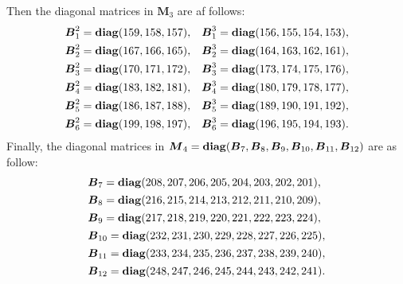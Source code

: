 \documentclass[12pt]{article}
\begin{document}
Then the diagonal matrices in $\boldsymbol{M}_{3}$ are af follows:
\begin{equation*}
	\begin{array}{ll}
		\boldsymbol{B}_{1}^{2}={\rm\bf diag}(159,158,157), 
		&\boldsymbol{B}_{1}^{3}={\rm\bf diag}(156,155,154,153),\\[4pt]
		\boldsymbol{B}_{2}^{2}={\rm\bf diag}(167,166,165), 
		&\boldsymbol{B}_{2}^{3}={\rm\bf diag}(164,163,162,161),\\[4pt]
		\boldsymbol{B}_{3}^{2}={\rm\bf diag}(170,171,172), 
		&\boldsymbol{B}_{3}^{3}={\rm\bf diag}(173,174,175,176),\\[4pt]
		\boldsymbol{B}_{4}^{2}={\rm\bf diag}(183,182,181), 
		&\boldsymbol{B}_{4}^{3}={\rm\bf diag}(180,179,178,177),\\[4pt]
		\boldsymbol{B}_{5}^{2}={\rm\bf diag}(186,187,188), 
		&\boldsymbol{B}_{5}^{3}={\rm\bf diag}(189,190,191,192),\\[4pt]
		\boldsymbol{B}_{6}^{2}={\rm\bf diag}(199,198,197), 
		&\boldsymbol{B}_{6}^{3}={\rm\bf diag}(196,195,194,193).
	\end{array}
\end{equation*}
Finally, the diagonal matrices in $\boldsymbol{M}_{4}={\rm\bf diag}(\boldsymbol{B}_{7},\boldsymbol{B}_{8},\boldsymbol{B}_{9},\boldsymbol{B}_{10},\boldsymbol{B}_{11},\boldsymbol{B}_{12})$ are as follow:
\begin{equation*}
	\begin{array}{l}
		\boldsymbol{B}_{7}={\rm\bf diag}(208,207,206,205,204,203,202,201),\\[4pt]
		\boldsymbol{B}_{8}={\rm\bf diag}(216,215,214,213,212,211,210,209),\\[4pt]
		\boldsymbol{B}_{9}={\rm\bf diag}(217,218,219,220,221,222,223,224), \\[4pt]
		\boldsymbol{B}_{10}={\rm\bf diag}(232,231,230,229,228,227,226,225),\\[4pt]
		\boldsymbol{B}_{11}={\rm\bf diag}(233,234,235,236,237,238,239,240), \\[4pt]
		\boldsymbol{B}_{12}={\rm\bf diag}(248,247,246,245,244,243,242,241).
		\end{array}
\end{equation*}
\end{document}
